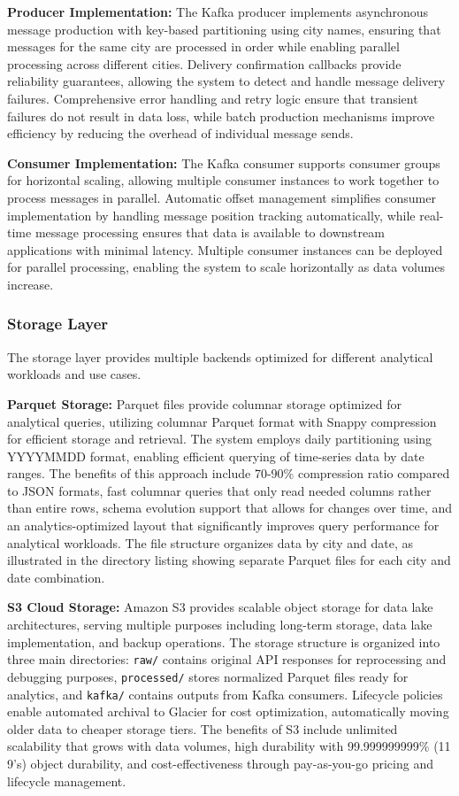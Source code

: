 \documentclass[12pt,a4paper]{article}
\begin{document}
\textbf{Producer Implementation:} The Kafka producer implements asynchronous message production with key-based partitioning using city names, ensuring that messages for the same city are processed in order while enabling parallel processing across different cities. Delivery confirmation callbacks provide reliability guarantees, allowing the system to detect and handle message delivery failures. Comprehensive error handling and retry logic ensure that transient failures do not result in data loss, while batch production mechanisms improve efficiency by reducing the overhead of individual message sends.

\textbf{Consumer Implementation:} The Kafka consumer supports consumer groups for horizontal scaling, allowing multiple consumer instances to work together to process messages in parallel. Automatic offset management simplifies consumer implementation by handling message position tracking automatically, while real-time message processing ensures that data is available to downstream applications with minimal latency. Multiple consumer instances can be deployed for parallel processing, enabling the system to scale horizontally as data volumes increase.

\subsubsection{Storage Layer}

The storage layer provides multiple backends optimized for different analytical workloads and use cases.

\textbf{Parquet Storage:} Parquet files provide columnar storage optimized for analytical queries, utilizing columnar Parquet format with Snappy compression for efficient storage and retrieval. The system employs daily partitioning using YYYYMMDD format, enabling efficient querying of time-series data by date ranges. The benefits of this approach include 70-90\% compression ratio compared to JSON formats, fast columnar queries that only read needed columns rather than entire rows, schema evolution support that allows for changes over time, and an analytics-optimized layout that significantly improves query performance for analytical workloads. The file structure organizes data by city and date, as illustrated in the directory listing showing separate Parquet files for each city and date combination.

\textbf{S3 Cloud Storage:} Amazon S3 provides scalable object storage for data lake architectures, serving multiple purposes including long-term storage, data lake implementation, and backup operations. The storage structure is organized into three main directories: \texttt{raw/} contains original API responses for reprocessing and debugging purposes, \texttt{processed/} stores normalized Parquet files ready for analytics, and \texttt{kafka/} contains outputs from Kafka consumers. Lifecycle policies enable automated archival to Glacier for cost optimization, automatically moving older data to cheaper storage tiers. The benefits of S3 include unlimited scalability that grows with data volumes, high durability with 99.999999999\% (11 9's) object durability, and cost-effectiveness through pay-as-you-go pricing and lifecycle management.
\end{document}
